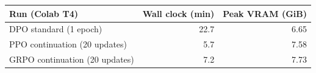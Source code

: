 \begin{tabular}{lrr}
\toprule
Run (Colab T4) & Wall clock (min) & Peak VRAM (GiB) \\
\midrule
DPO standard (1 epoch) & 22.7 & 6.65 \\
PPO continuation (20 updates) & 5.7 & 7.58 \\
GRPO continuation (20 updates) & 7.2 & 7.73 \\
\bottomrule
\end{tabular}

